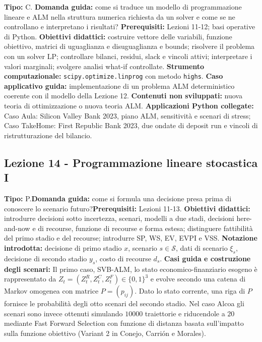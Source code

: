 \documentclass[12pt,a4paper]{article}%
\newcommand{\1}{\mathbf{1}}
\begin{document}
\textbf{Tipo:} C.\newline
\textbf{Domanda guida:} come si traduce un modello di programmazione lineare
e ALM nella struttura numerica richiesta da un solver e come se ne
controllano e interpretano i risultati?\newline
\textbf{Prerequisiti:} Lezioni 11-12; basi operative di Python.\newline
\textbf{Obiettivi didattici:} costruire vettore delle variabili, funzione
obiettivo, matrici di uguaglianza e disuguaglianza e bounds; risolvere il
problema con un solver LP; controllare bilanci, residui, slack e vincoli
attivi; interpretare i valori marginali; svolgere analisi what-if
controllate.\newline
\textbf{Strumento computazionale:} \texttt{scipy.optimize.linprog} con
metodo \texttt{highs}.\newline
\textbf{Caso applicativo guida:} implementazione di un problema ALM
deterministico coerente con il modello della Lezione 12.\newline
\textbf{Contenuti non sviluppati:} nuova teoria di ottimizzazione o nuova
teoria ALM.\newline
\textbf{Applicazioni Python collegate:} Caso Aula: Silicon Valley Bank 2023, piano ALM,
sensitivit\`{a} e scenari di stress; Caso TakeHome: First Republic Bank 2023,
due ondate di deposit run e vincoli di ristrutturazione del bilancio.

\subsection{Lezione 14 - Programmazione lineare stocastica I}

\textbf{Tipo:} P.\newline\textbf{Domanda guida:} come si formula una decisione
presa prima di conoscere lo scenario futuro?\newline\textbf{Prerequisiti:}
Lezioni 11-13.
\newline\textbf{Obiettivi didattici:} introdurre decisioni sotto incertezza, scenari,
modelli a due stadi, decisioni here-and-now e di recourse, funzione di
recourse e forma estesa; distinguere fattibilit\`{a} del primo stadio e del
recourse; introdurre SP, WS, EV, EVPI e VSS.
\newline\textbf{Notazione introdotta:} decisione di primo
stadio $x$, scenario $s\in\mathcal{S}$, dati di scenario $\xi_{s}$, decisione
di secondo stadio $y_{s}$, costo di recourse $d_{s}$.
\newline\textbf{Casi guida e costruzione degli scenari:} Il primo caso, SVB-ALM, lo stato
economico-finanziario esogeno \`e rappresentato da
$Z_t=(Z_t^R,Z_t^C,Z_t^F)\in\{0,1\}^3$ e evolve secondo una catena di Markov
omogenea con matrice $P=(p_{ij})$. Dato lo stato corrente, una riga di $P$
fornisce le probabilit\`a degli otto scenari del secondo stadio. Nel caso
Alcoa gli scenari sono invece ottenuti simulando $10000$ traiettorie e
riducendole a $20$ mediante Fast Forward Selection con funzione di distanza basata sull'impatto
sulla funzione obiettivo (Variant 2 in Conejo, Carri\'{o}n e Morales).
\end{document}
